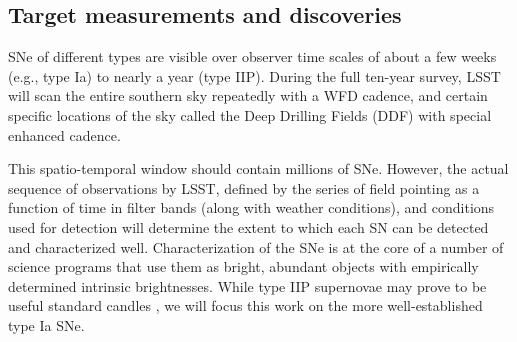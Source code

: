 
\subsection{Target measurements and discoveries}
\label{sec:\secname:targets}

SNe of different types are visible over observer time scales of about a few
weeks (e.g., type Ia) to nearly a year (type IIP).  During the full
ten-year survey, LSST will scan the entire southern sky repeatedly with
a WFD cadence, and certain specific locations of the sky called the Deep
Drilling Fields (DDF) with special enhanced cadence.

This spatio-temporal window should contain millions
of SNe. However, the actual sequence of
observations by LSST, defined by the series of field pointing as a
function of time in filter bands (along with weather conditions), and
conditions used for detection will determine the extent to which each
SN can be detected and characterized well.  Characterization of the SNe
is at the core of a number of science
programs that use them as bright, abundant objects with empirically
determined intrinsic brightnesses. While type IIP supernovae may prove to be useful standard
candles \citep{Sanders2014}, we will focus this work on the more well-established type Ia SNe.

